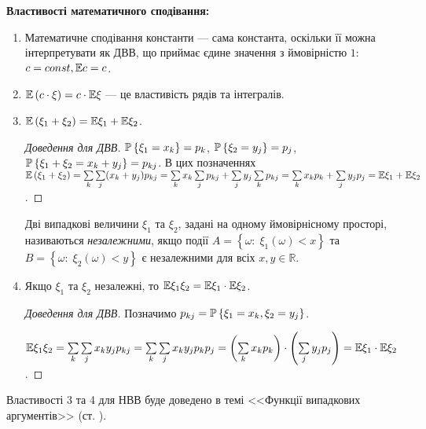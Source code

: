 \vspace{0.5em}
\noindent \textbf{Властивості математичного сподівання:}
\begin{enumerate}
    \item Математичне сподівання константи --- сама константа, оскільки
    її можна інтерпретувати як ДВВ, що приймає єдине значення з ймовірністю $1$:
    $c = const, \E c = c$.
    \item $\E \left(c\cdot\xi\right) = c\cdot \E\xi$ --- це властивість рядів та інтегралів.
    \item $\E\left( \xi_1 + \xi_2\right) = \E\xi_1 + \E\xi_2$.
    \begin{proof}[Доведення для ДВВ]
        $\P\left\{\xi_1 = x_k\right\} = p_k$, $\P\left\{\xi_2 = y_j\right\} = p_j$, $\P\left\{\xi_1 + \xi_2 = x_k + y_j\right\} = p_{kj}$.
        В цих позначеннях
        $\E\left( \xi_1 + \xi_2\right) = \sum\limits_k \sum\limits_j (x_k+y_j) p_{kj} =
        \sum\limits_k x_k \sum\limits_j p_{kj} + \sum\limits_j y_j \sum\limits_k p_{kj} = \sum\limits_k x_k p_k + \sum\limits_j y_j p_j = \E\xi_1 + \E\xi_2$.
    \end{proof}
\begin{definition}
    Дві випадкові величини $\xi_1$ та $\xi_2$, задані на одному ймовірнісному просторі, називаються \emph{незалежними}, якщо
    події $A=\left\{\omega : \; \xi_1(\omega) < x\right\}$ та
    $B=\left\{\omega : \; \xi_2(\omega) < y\right\}$ є незалежними для всіх $x, y \in \mathbb{R}$.
\end{definition}
    \item Якщо $\xi_1$ та $\xi_2$ незалежні, то $\E\xi_1\xi_2 = \E\xi_1 \cdot \E\xi_2$.
    \begin{proof}[Доведення для ДВВ]
        Позначимо $p_{kj} = \P\left\{\xi_1 = x_k, \xi_2 = y_j\right\}$.
        
        $\E\xi_1\xi_2 = \sum\limits_k \sum\limits_j x_k y_j p_{kj} = \sum\limits_k \sum\limits_j x_k y_j p_k p_j = \left( \sum\limits_k x_k p_k\right)\cdot \left( \sum\limits_j y_j p_j\right) = \E\xi_1 \cdot \E\xi_2$.
    \end{proof}
\end{enumerate}
\begin{remark}
    Властивості 3 та 4 для НВВ буде доведено в темі <<Функції випадкових аргументів>> (ст. \pageref{proof:expectation}).
\end{remark}

